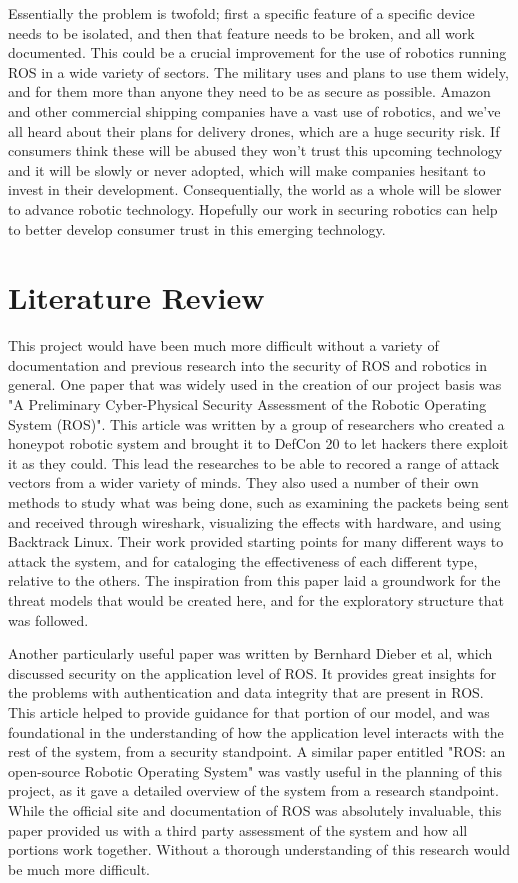 \documentclass[IEEEtran,letterpaper,10pt,notitlepage,draftclsnofoot]{article}
\begin{document}
Essentially the problem is twofold; first a specific feature of a specific device needs to be isolated, and then that feature needs to be broken, and all work documented.
This could be a crucial improvement for the use of robotics running ROS in a wide variety of sectors.
The military uses and plans to use them widely, and for them more than anyone they need to be as secure as possible.
Amazon and other commercial shipping companies have a vast use of robotics, and we've all heard about their plans for delivery drones, which are a huge security risk.
If consumers think these will be abused they won't trust this upcoming technology and it will be slowly or never adopted, which will make companies hesitant to invest in their development.
Consequentially, the world as a whole will be slower to advance robotic technology.
Hopefully our work in securing robotics can help to better develop consumer trust in this emerging technology.

\section{Literature Review}
This project would have been much more difficult without a variety of documentation and previous research into the security of ROS and robotics in general.
One paper that was widely used in the creation of our project basis was "A Preliminary Cyber-Physical Security Assessment of the Robotic Operating System (ROS)". \cite{mainROS}
This article was written by a group of researchers who created a honeypot robotic system and brought it to DefCon 20 to let hackers there exploit it as they could.
This lead the researches to be able to recored a range of attack vectors from a wider variety of minds.
They also used a number of their own methods to study what was being done, such as examining the packets being sent and received through wireshark, visualizing the effects with hardware, and using Backtrack Linux.
Their work provided starting points for many different ways to attack the system, and for cataloging the effectiveness of each different type, relative to the others.
The inspiration from this paper laid a groundwork for the threat models that would be created here, and for the exploratory structure that was followed.

Another particularly useful paper was written by Bernhard Dieber et al, which discussed security on the application level of ROS.
It provides great insights for the problems with authentication and data integrity that are present in ROS. \cite{App}
This article helped to provide guidance for that portion of our model, and was foundational in the understanding of how the application level interacts with the rest of the system, from a security standpoint. 
A similar paper entitled "ROS: an open-source Robotic Operating System" was vastly useful in the planning of this project, as it gave a detailed overview of the system from a research standpoint.
While the official site and documentation of ROS was absolutely invaluable, this paper provided us with a third party assessment of the system and how all portions work together.
Without a thorough understanding of this research would be much more difficult. \cite{Open}
 
\end{document}
